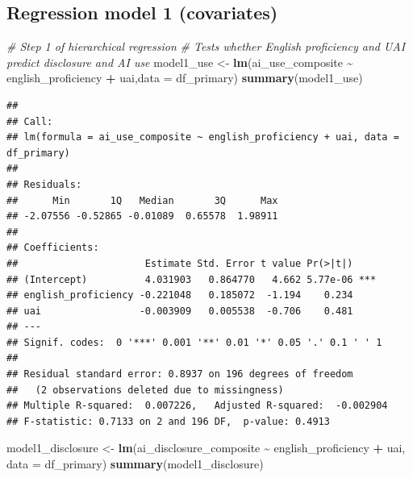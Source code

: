 \documentclass[
]{article}
\newenvironment{Shaded}{\begin{snugshade}}{\end{snugshade}}
\newcommand{\AttributeTok}[1]{\textcolor[rgb]{0.13,0.29,0.53}{#1}}
\newcommand{\CommentTok}[1]{\textcolor[rgb]{0.56,0.35,0.01}{\textit{#1}}}
\newcommand{\FunctionTok}[1]{\textcolor[rgb]{0.13,0.29,0.53}{\textbf{#1}}}
\newcommand{\NormalTok}[1]{#1}
\newcommand{\OtherTok}[1]{\textcolor[rgb]{0.56,0.35,0.01}{#1}}
\newcommand{\SpecialCharTok}[1]{\textcolor[rgb]{0.81,0.36,0.00}{\textbf{#1}}}
\begin{document}
\subsection{Regression model 1
(covariates)}\label{regression-model-1-covariates}

\begin{Shaded}
\begin{Highlighting}[]
\CommentTok{\# Step 1 of hierarchical regression}
\CommentTok{\# Tests whether English proficiency and UAI predict disclosure and AI use}
\NormalTok{model1\_use }\OtherTok{\textless{}{-}} \FunctionTok{lm}\NormalTok{(ai\_use\_composite }\SpecialCharTok{\textasciitilde{}}\NormalTok{ english\_proficiency }\SpecialCharTok{+}\NormalTok{ uai,}\AttributeTok{data =}\NormalTok{ df\_primary)}
\FunctionTok{summary}\NormalTok{(model1\_use)}
\end{Highlighting}
\end{Shaded}

\begin{verbatim}
## 
## Call:
## lm(formula = ai_use_composite ~ english_proficiency + uai, data = df_primary)
## 
## Residuals:
##      Min       1Q   Median       3Q      Max 
## -2.07556 -0.52865 -0.01089  0.65578  1.98911 
## 
## Coefficients:
##                      Estimate Std. Error t value Pr(>|t|)    
## (Intercept)          4.031903   0.864770   4.662 5.77e-06 ***
## english_proficiency -0.221048   0.185072  -1.194    0.234    
## uai                 -0.003909   0.005538  -0.706    0.481    
## ---
## Signif. codes:  0 '***' 0.001 '**' 0.01 '*' 0.05 '.' 0.1 ' ' 1
## 
## Residual standard error: 0.8937 on 196 degrees of freedom
##   (2 observations deleted due to missingness)
## Multiple R-squared:  0.007226,   Adjusted R-squared:  -0.002904 
## F-statistic: 0.7133 on 2 and 196 DF,  p-value: 0.4913
\end{verbatim}

\begin{Shaded}
\begin{Highlighting}[]
\NormalTok{model1\_disclosure }\OtherTok{\textless{}{-}} \FunctionTok{lm}\NormalTok{(ai\_disclosure\_composite }\SpecialCharTok{\textasciitilde{}}\NormalTok{ english\_proficiency }\SpecialCharTok{+}\NormalTok{ uai, }\AttributeTok{data =}\NormalTok{ df\_primary)}
\FunctionTok{summary}\NormalTok{(model1\_disclosure)}
\end{Highlighting}
\end{Shaded}
\end{document}
